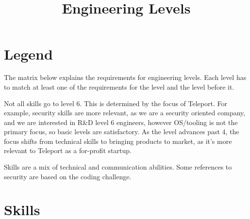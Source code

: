 \documentclass{article}
\begin{document}
 
\title{Engineering Levels}

\section{Legend}
 
The matrix below explains the requirements for engineering levels. Each level has to match at least one of the requirements for the level and the level before it.

Not all skills go to level 6. This is determined by the focus of Teleport.
For example, security skills are more relevant, as we are a security oriented company, and we are interested in R\&D level 6 engineers, however OS/tooling is not the primary focus, so basic levels are satisfactory.
As the level advances past 4, the focus shifts from technical skills to bringing products to market, as it's more relevant to Teleport as a for-profit startup.

Skills are a mix of technical and communication abilities. Some references to security are based on the coding challenge.

\section{Skills}
    
\end{document}
